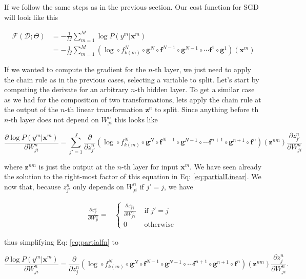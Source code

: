 If we follow the same steps as in the previous section. Our cost function for
SGD will look like this

\begin{align}
\mathcal{F}(\mathcal{D};\Theta) & = -\frac{1}{M}\sum_{m=1}^M \log P(y^m | \mathbf{x}^m)\nonumber\\ & = -\frac{1}{M}\sum_{m=1}^M (\log \circ f_{k(m)}^N \circ \mathbf{g}^N \circ \mathbf{f}^{N-1} \circ \mathbf{g}^{N-1} \circ \cdots \mathbf{f}^1 \circ \mathbf{g}^1)(\mathbf{x}^m)
\end{align}

If we wanted to compute the gradient for the $n$-th layer, we just need to
apply the chain rule as in the previous cases, selecting a variable to split.
Let's start by computing the derivate for an arbitrary $n$-th hidden layer. To
get a similar case as we had for the composition of two transformations, lets
apply the chain rule at the output of the $n$-th linear transformation
$\mathbf{z}^n$ to split. Since anything before th $n$-th layer does not depend
on $W_{ji}^n$ this looks like  

\begin{equation}
\frac{\partial \log P(y^m | \mathbf{x}^m)}{\partial W_{ji}^n} = \sum_{j'=1}^J \frac{\partial}{\partial z^n_{j'}} (\log \circ f_{k(m)}^N \circ \mathbf{g}^N \circ \mathbf{f}^{N-1} \circ \mathbf{g}^{N-1} \circ \cdots \mathbf{f}^{n+1} \circ \mathbf{g}^{n+1} \circ \mathbf{f}^{n})(\mathbf{z}^{nm})\frac{\partial z^n_{j'}}{\partial W_{ji}^n}
\label{eq:partialfn}
\end{equation}

where $\mathbf{z}^{nm}$ is just the output at the $n$-th layer for input
$\mathbf{x}^{m}$. We have seen already the solution to the right-most factor of
this equation in Eq: \ref{eq:partialLinear}. We now that, because $z^n_{j'}$
only depends on $W_{ji}^n$ if $j'=j$, we have 

\begin{align}
\frac{\partial z^n_{j'}}{\partial W_{ji}^n} =  
  &\begin{cases}
   \frac{\partial z^n_{j'i}}{\partial W_{j'i}^n}  &  \mbox{ if } j' = j\\ 
    0    &  \mbox{ otherwise } 
 \end{cases}
\end{align}

\noindent thus simplifying Eq: \ref{eq:partialfn} to

\begin{equation}
\frac{\partial \log P(y^m | \mathbf{x}^m)}{\partial W_{ji}^n} = \frac{\partial}{\partial z^n_{j}} (\log \circ f_{k(m)}^N \circ \mathbf{g}^N \circ \mathbf{f}^{N-1} \circ \mathbf{g}^{N-1} \circ \cdots \mathbf{f}^{n+1} \circ \mathbf{g}^{n+1} \circ \mathbf{f}^{n})(\mathbf{z}^{nm})\frac{\partial z^n_{j}}{\partial W_{ji}^n}.
\label{eq:partialfn2}
\end{equation}

